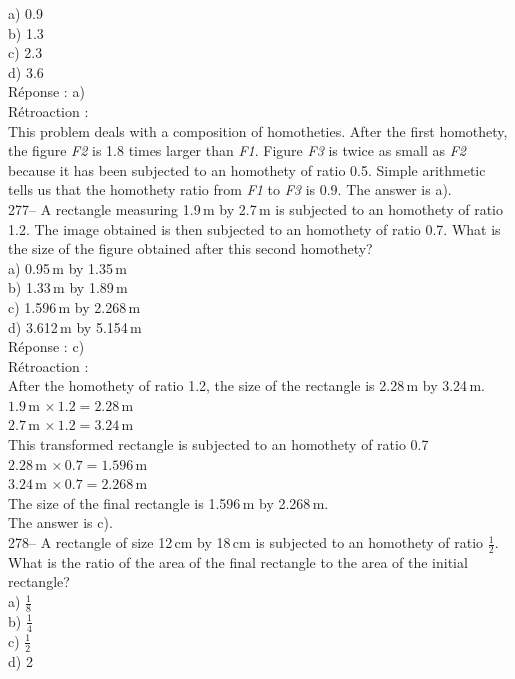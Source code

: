\documentclass[letterpaper, 12pt]{article}
\begin{document}
a) 0.9\\
b) 1.3\\
c) 2.3\\
d) 3.6\\

R\'eponse : a)\\

R\'etroaction : \\
This problem deals with a composition of homotheties. After the
first homothety, the figure \emph{F2} is 1.8 times larger than
\emph{F1}. Figure \emph{F3} is twice as small as \emph{F2} because
it has been subjected to an homothety of ratio 0.5. Simple
arithmetic tells us that the
homothety ratio from \emph{F1} to \emph{F3} is 0.9. The answer is a).\\

277-- A rectangle measuring 1.9\,m by 2.7\,m is subjected to an
homothety of ratio 1.2. The image obtained is then subjected to an
homothety of ratio 0.7. What is the size of the figure obtained
after this second homothety?\\


a) 0.95\,m by 1.35\,m\\
b) 1.33\,m by 1.89\,m\\
c) 1.596\,m by 2.268\,m\\
d) 3.612\,m by 5.154\,m\\

R\'eponse : c)\\

R\'etroaction : \\
After the homothety of ratio 1.2, the size of the rectangle is
2.28\,m by 3.24\,m.\\
$1.9$\,m $\times\,1.2=2.28$\,m\\
$2.7$\,m $\times\,1.2=3.24$\,m\\
This transformed rectangle is subjected to an homothety of ratio
0.7\\
$2.28$\,m $\times\,0.7=1.596$\,m\\
$3.24$\,m $\times\,0.7=2.268$\,m\\
The size of the final rectangle is 1.596\,m by 2.268\,m.\\
The answer is c).\\

278-- A rectangle of size 12\,cm by 18\,cm is subjected to an
homothety of ratio $\frac{1}{2}.$ What is the ratio of the area of
the final rectangle to the area of the initial rectangle?\\

a) $\frac{1}{8}$\\[2mm]
b) $\frac{1}{4}$\\[2mm]
c) $\frac{1}{2}$\\[2mm]
d) 2\\
\end{document}
